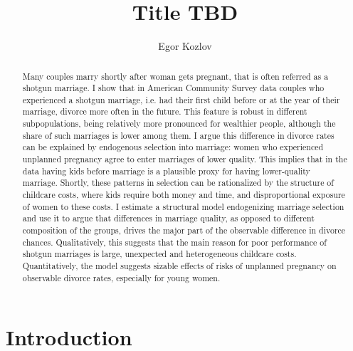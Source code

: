\documentclass[12pt,letter]{article}
\title{Title TBD}
\author{Egor Kozlov}
\begin{document}
\maketitle

\begin{abstract}
Many couples marry shortly after woman gets pregnant, that is often referred as a shotgun marriage. I show that in American Community Survey data couples who experienced a shotgun marriage, i.e. had their first child before or at the year of their marriage, divorce more often in the future. This feature is robust in different subpopulations, being relatively more pronounced for wealthier people, although the share of such marriages is lower among them. I argue this difference in divorce rates can be explained by endogenous selection into marriage: women who experienced unplanned pregnancy agree to enter marriages of lower quality. This implies that in the data having kids before marriage is a plausible proxy for having lower-quality marriage. Shortly, these patterns in selection can be rationalized by the structure of childcare costs, where kids require both money and time, and disproportional exposure of women to these costs. I estimate a structural model endogenizing marriage selection and use it to argue that differences in marriage quality, as opposed to different composition of the groups, drives the major part of the observable difference in divorce chances. Qualitatively, this suggests that the main reason for poor performance of shotgun marriages is large, unexpected and heterogeneous childcare costs. Quantitatively, the model suggests sizable effects of risks of unplanned pregnancy on observable divorce rates, especially for young women.
\end{abstract}

\section{Introduction}
\end{document}

